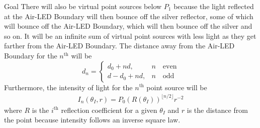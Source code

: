 \documentclass[12pt]{article}
\newcommand{\enterProblemHeader}[1]{
	\rhead{#1}
}
\newenvironment{main_section}[1]{
	\section{#1}
	\enterProblemHeader{#1}
}{
	\pagebreak
}
\begin{document}
\begin{main_section}{Goal}
	There will also be virtual point sources below $P_1$ because the light
	reflected at the Air-LED Boundary will then bounce off the silver reflector,
	some of which will bounce off the Air-LED Boundary, which will then bounce
	off the silver and so on. It will be an infinite sum of virtual point
	sources with less light as they get farther from the Air-LED Boundary. The
	distance away from the Air-LED Boundary for the $n^\text{th}$ will be
	\[
		d_n =
		\begin{cases}
		d_0 + nd, & n\quad\text{even}\\
		d - d_0 + nd, & n\quad\text{odd}
		\end{cases}
	\]
	Furthermore, the intensity of light for the $n^\text{th}$ point source will
	be
	\begin{align*}
		I_n(\theta_I, r) = P_0 \left(R(\theta_I)\right)^{\lfloor n / 2 \rfloor}
		r^{-2}
	\end{align*}
	where $R$ is the $i^\text{th}$ reflection coefficient for a given
	$\theta_I$ and $r$ is the distance from the point because intensity follows
	an inverse square law.
\end{main_section}
\end{document}
